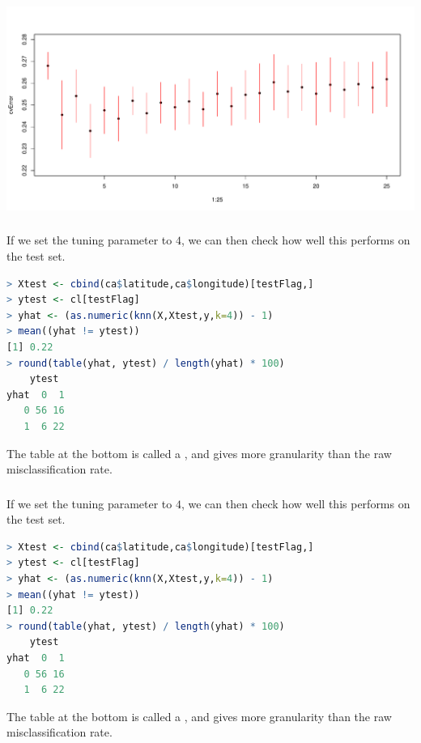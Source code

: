 \documentclass[xetex,mathserif,serif,aspectratio=169]{beamer}
\begin{document}
\begin{frame}[fragile] \frametitle{} \oldB \small

\begin{center}
\includegraphics[width=\textwidth]{img/fig02.pdf}
\end{center}

\end{frame}

\begin{frame}[fragile] \frametitle{} \oldB \small

If we set the tuning parameter to $4$, we can then check
how well this performs on the test set.
\begin{lstlisting}[language=R, basicstyle=\fontsize{8pt}{10pt}\selectfont\ttfamily]
> Xtest <- cbind(ca$latitude,ca$longitude)[testFlag,]
> ytest <- cl[testFlag]
> yhat <- (as.numeric(knn(X,Xtest,y,k=4)) - 1)
> mean((yhat != ytest))
[1] 0.22
> round(table(yhat, ytest) / length(yhat) * 100)
    ytest
yhat  0  1
   0 56 16
   1  6 22
\end{lstlisting}
The table at the bottom is called a , and
gives more granularity than the raw misclassification rate.

\end{frame}

\begin{frame}[fragile] \frametitle{} \oldB \small

If we set the tuning parameter to $4$, we can then check
how well this performs on the test set.
\begin{lstlisting}[language=R, basicstyle=\fontsize{8pt}{10pt}\selectfont\ttfamily]
> Xtest <- cbind(ca$latitude,ca$longitude)[testFlag,]
> ytest <- cl[testFlag]
> yhat <- (as.numeric(knn(X,Xtest,y,k=4)) - 1)
> mean((yhat != ytest))
[1] 0.22
> round(table(yhat, ytest) / length(yhat) * 100)
    ytest
yhat  0  1
   0 56 16
   1  6 22
\end{lstlisting}
The table at the bottom is called a , and
gives more granularity than the raw misclassification rate.

\end{frame}
\end{document}
